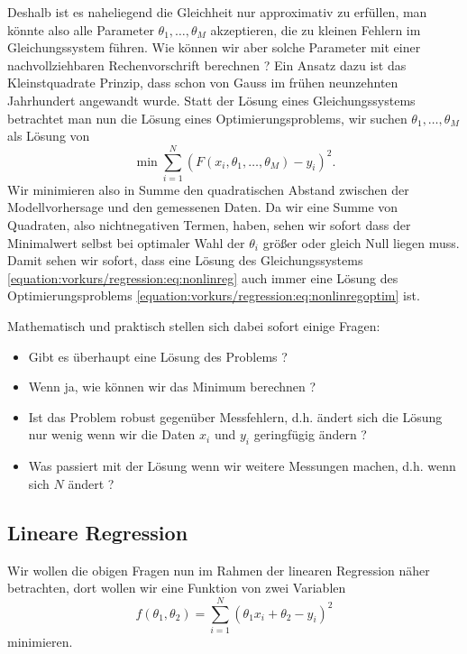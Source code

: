 Deshalb ist es naheliegend die Gleichheit nur approximativ zu erfüllen, man könnte also alle Parameter \(\theta_1,\ldots,\theta_M\) akzeptieren, die zu kleinen Fehlern im Gleichungssystem führen. Wie können wir aber solche Parameter mit einer nachvollziehbaren Rechenvorschrift berechnen ? Ein Ansatz dazu ist das Kleinstquadrate Prinzip, dass schon von Gauss im frühen neunzehnten Jahrhundert angewandt wurde. Statt der Lösung eines Gleichungssystems betrachtet man nun die Lösung eines Optimierungsproblems, wir suchen \(\theta_1,\ldots,\theta_M\) als Lösung von
\begin{equation}\label{equation:vorkurs/regression:eq:nonlinregoptim}
\min \sum_{i=1}^N ( F(x_i,\theta_1,\ldots,\theta_M) - y_i)^2.
\end{equation}
Wir minimieren also in Summe den quadratischen Abstand zwischen der Modellvorhersage und den gemessenen Daten.
Da wir eine Summe von Quadraten, also nichtnegativen Termen, haben, sehen wir sofort dass der Minimalwert selbst bei optimaler Wahl der \(\theta_i\) größer oder gleich Null liegen muss. Damit sehen wir sofort, dass eine Lösung des Gleichungssystems \eqref{equation:vorkurs/regression:eq:nonlinreg} auch immer eine Lösung des Optimierungsproblems \eqref{equation:vorkurs/regression:eq:nonlinregoptim} ist.

Mathematisch und praktisch stellen sich dabei sofort einige Fragen:
\begin{itemize}
\item {} 
Gibt es überhaupt eine Lösung des Problems ?

\item {} 
Wenn ja, wie können wir das Minimum berechnen ?

\item {} 
Ist das Problem robust gegenüber Messfehlern, d.h. ändert sich die Lösung nur wenig wenn wir die Daten \(x_i\) und \(y_i\) geringfügig ändern ?

\item {} 
Was passiert mit der Lösung wenn wir weitere Messungen machen, d.h. wenn sich \(N\) ändert ?

\end{itemize}


\subsection{Lineare Regression}
\label{\detokenize{vorkurs/regression:lineare-regression}}
Wir wollen die obigen Fragen nun im Rahmen der linearen Regression näher betrachten, dort wollen wir eine Funktion von zwei Variablen
\begin{equation*}
 f(\theta_1,\theta_2) =  \sum_{i=1}^N (\theta_1 x_i + \theta_2 -y_i)^2\end{equation*}
minimieren.

